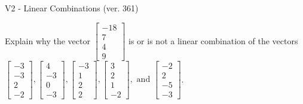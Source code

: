 \begin{exercise}
  \begin{exerciseTitle}V2 - Linear Combinations (ver. 361)\end{exerciseTitle}
  \begin{exerciseStatement}
    Explain why the vector \(\left[\begin{array}{c}
-18 \\
7 \\
4 \\
9
\end{array}\right]\)  is or is not a linear 
	combination of the vectors \(\left[\begin{array}{c}
-3 \\
-3 \\
2 \\
-2
\end{array}\right] , \left[\begin{array}{c}
4 \\
-3 \\
0 \\
-3
\end{array}\right] , \left[\begin{array}{c}
-3 \\
1 \\
2 \\
2
\end{array}\right] , \left[\begin{array}{c}
3 \\
2 \\
1 \\
-2
\end{array}\right] , \text{ and } \left[\begin{array}{c}
-2 \\
2 \\
-5 \\
-3
\end{array}\right]\).
	



\end{exerciseStatement}
\end{exercise}
